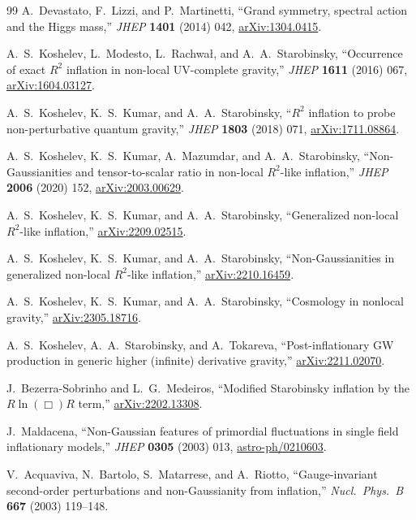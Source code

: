 \documentclass[11pt,a4paper]{article}
\theoremstyle{plain}
\theoremstyle{definition}
\begin{document}
\begin{thebibliography}{99}
A.~Devastato, F.~Lizzi, and P.~Martinetti,
``Grand symmetry, spectral action and the Higgs mass,''
\emph{JHEP} \textbf{1401} (2014) 042,
\href{https://arxiv.org/abs/1304.0415}{arXiv:1304.0415}.

A.~S.~Koshelev, L.~Modesto, L.~Rachwa{\l}, and A.~A.~Starobinsky,
``Occurrence of exact $R^2$ inflation in non-local UV-complete gravity,''
\emph{JHEP} \textbf{1611} (2016) 067,
\href{https://arxiv.org/abs/1604.03127}{arXiv:1604.03127}.

A.~S.~Koshelev, K.~S.~Kumar, and A.~A.~Starobinsky,
``$R^2$ inflation to probe non-perturbative quantum gravity,''
\emph{JHEP} \textbf{1803} (2018) 071,
\href{https://arxiv.org/abs/1711.08864}{arXiv:1711.08864}.

A.~S.~Koshelev, K.~S.~Kumar, A.~Mazumdar, and A.~A.~Starobinsky,
``Non-Gaussianities and tensor-to-scalar ratio in non-local
$R^2$-like inflation,''
\emph{JHEP} \textbf{2006} (2020) 152,
\href{https://arxiv.org/abs/2003.00629}{arXiv:2003.00629}.

A.~S.~Koshelev, K.~S.~Kumar, and A.~A.~Starobinsky,
``Generalized non-local $R^2$-like inflation,''
\href{https://arxiv.org/abs/2209.02515}{arXiv:2209.02515}.

A.~S.~Koshelev, K.~S.~Kumar, and A.~A.~Starobinsky,
``Non-Gaussianities in generalized non-local $R^2$-like inflation,''
\href{https://arxiv.org/abs/2210.16459}{arXiv:2210.16459}.

A.~S.~Koshelev, K.~S.~Kumar, and A.~A.~Starobinsky,
``Cosmology in nonlocal gravity,''
\href{https://arxiv.org/abs/2305.18716}{arXiv:2305.18716}.

A.~S.~Koshelev, A.~A.~Starobinsky, and A.~Tokareva,
``Post-inflationary GW production in generic higher (infinite)
derivative gravity,''
\href{https://arxiv.org/abs/2211.02070}{arXiv:2211.02070}.

J.~Bezerra-Sobrinho and L.~G.~Medeiros,
``Modified Starobinsky inflation by the $R\ln(\Box)R$ term,''
\href{https://arxiv.org/abs/2202.13308}{arXiv:2202.13308}.

J.~Maldacena,
``Non-Gaussian features of primordial fluctuations in single field
inflationary models,''
\emph{JHEP} \textbf{0305} (2003) 013,
\href{https://arxiv.org/abs/astro-ph/0210603}{astro-ph/0210603}.

V.~Acquaviva, N.~Bartolo, S.~Matarrese, and A.~Riotto,
``Gauge-invariant second-order perturbations and non-Gaussianity
from inflation,''
\emph{Nucl.\ Phys.\ B} \textbf{667} (2003) 119--148.


\end{thebibliography}
\end{document}
